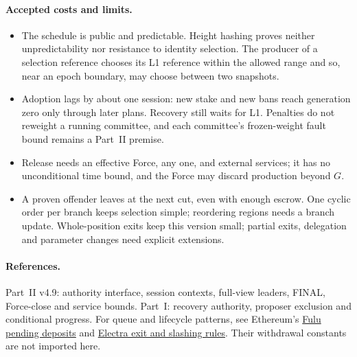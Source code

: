 \documentclass[11pt,a4paper]{article}
\begin{document}
\paragraph{Accepted costs and limits.}
\begin{itemize}[itemsep=3pt]
\item The schedule is public and predictable. Height hashing proves
neither unpredictability nor resistance to identity selection. The
producer of a selection reference chooses its L1 reference within the
allowed range and so, near an epoch boundary, may choose between two
snapshots.
\item Adoption lags by about one session: new stake and new bans reach
generation zero only through later plans. Recovery still waits for L1.
Penalties do not reweight a running committee, and each committee's
frozen-weight fault bound remains a Part~II premise.
\item Release needs an effective Force, any one, and external services;
it has no unconditional time bound, and the Force may discard production
beyond $G$.
\item A proven offender leaves at the next cut, even with enough escrow.
One cyclic order per branch keeps selection simple; reordering regions
needs a branch update. Whole-position exits keep this version small;
partial exits, delegation and parameter changes need explicit extensions.
\end{itemize}

\paragraph{References.}
Part~II v4.9: authority interface, session contexts, full-view leaders,
FINAL, Force-close and service bounds.
Part~I: recovery authority, proposer exclusion and conditional progress.
For queue and lifecycle patterns, see Ethereum's
\href{https://ethereum.github.io/consensus-specs/specs/fulu/beacon-chain/}{Fulu pending deposits}
and \href{https://ethereum.github.io/consensus-specs/specs/electra/beacon-chain/}{Electra exit and slashing rules}.
Their withdrawal constants are not imported here.
\end{document}
